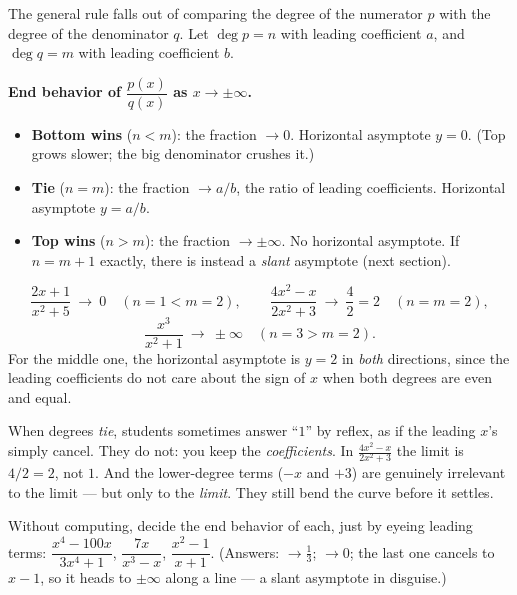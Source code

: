 The general rule falls out of comparing the degree of the numerator $p$ with the
degree of the denominator $q$. Let $\deg p = n$ with leading coefficient $a$, and
$\deg q = m$ with leading coefficient $b$.

\begin{focusbox}
\textbf{End behavior of $\dfrac{p(x)}{q(x)}$ as $x\to\pm\infty$.}
\begin{itemize}
\item \textbf{Bottom wins} ($n<m$): the fraction $\to 0$. Horizontal asymptote
$y=0$. (Top grows slower; the big denominator crushes it.)
\item \textbf{Tie} ($n=m$): the fraction $\to a/b$, the ratio of leading
coefficients. Horizontal asymptote $y=a/b$.
\item \textbf{Top wins} ($n>m$): the fraction $\to \pm\infty$. No horizontal
asymptote. If $n=m+1$ exactly, there is instead a \emph{slant} asymptote
(next section).
\end{itemize}
\end{focusbox}

\begin{example}
\label{ch09:ex-three-cases}
\[
\frac{2x+1}{x^2+5}\ \to\ 0
\quad(n=1<m=2),
\qquad
\frac{4x^2-x}{2x^2+3}\ \to\ \frac{4}{2}=2
\quad(n=m=2),
\]
\[
\frac{x^3}{x^2+1}\ \to\ \pm\infty
\quad(n=3>m=2).
\]
For the middle one, the horizontal asymptote is $y=2$ in \emph{both} directions,
since the leading coefficients do not care about the sign of $x$ when both
degrees are even and equal.
\end{example}

\begin{trapbox}
When degrees \emph{tie}, students sometimes answer ``$1$'' by reflex, as if the
leading $x$'s simply cancel. They do not: you keep the \emph{coefficients}. In
$\frac{4x^2-x}{2x^2+3}$ the limit is $4/2=2$, not $1$. And the lower-degree
terms ($-x$ and $+3$) are genuinely irrelevant to the limit --- but only to the
\emph{limit}. They still bend the curve before it settles.
\end{trapbox}

\begin{walkbox}
Without computing, decide the end behavior of each, just by eyeing leading
terms: $\dfrac{x^4-100x}{3x^4+1}$, $\dfrac{7x}{x^3-x}$,
$\dfrac{x^2-1}{x+1}$. (Answers: $\to \tfrac13$; $\to 0$; the last one cancels to
$x-1$, so it heads to $\pm\infty$ along a line --- a slant asymptote in disguise.)
\end{walkbox}

